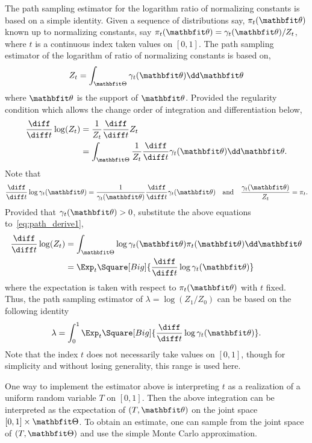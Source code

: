 The path sampling estimator for the logarithm ratio of normalizing constants
is based on a simple identity. Given a sequence of distributions say,
$\pi_t(\bth)$ known up to normalizing constants, say $\pi_t(\bth) =
\gamma_t(\bth)/Z_t$, where $t$ is a continuous index taken values on $[0,1]$.
The path sampling estimator of the logarithm of ratio of normalizing constants
is based on,
\begin{equation}
  Z_t = \int_{\bTh}\gamma_t(\bth)\dd\bth
\end{equation}
where $\bth$ is the support of $\bth$. Provided the regularity condition which
allows the change order of integration and differentiation below,
\begin{align}
  \frac{\diff}{\diff t}\log(Z_t)
  &= \frac{1}{Z_t}\frac{\diff}{\diff t}Z_t \notag\\
  &= \int_{\bTh}\frac{1}{Z_t}
  \frac{\diff}{\diff t}\gamma_t(\bth)\dd\bth.
  \label{eq:path_derive1}
\end{align}
Note that
\begin{equation}
  \frac{\diff}{\diff t}\log\gamma_t(\bth)
  = \frac{1}{\gamma_t(\bth)}\frac{\diff}{\diff t}\gamma_t(\bth)
  \quad\text{and}\quad
  \frac{\gamma_t(\bth)}{Z_t} = \pi_t.
\end{equation}
Provided that $\gamma_t(\bth)>0$, substitute the above equations
to~\eqref{eq:path_derive1},
\begin{align}
  \frac{\diff}{\diff t}\log(Z_t)
  &= \int_{\bTh}\log\gamma_t(\bth)\pi_t(\bth)\dd\bth \notag\\
  &= \Exp_t\Square[Big]{\frac{\diff}{\diff t}\log\gamma_t(\bth)}
\end{align}
where the expectation is taken with respect to $\pi_t(\bth)$ with $t$ fixed.
Thus, the path sampling estimator of $\lambda=\log(Z_1/Z_0)$ can be based on
the following identity
\begin{equation}
  \lambda=
  \int_0^1 \Exp_t\Square[Big]{\frac{\diff}{\diff t}\log \gamma_t(\bth)}.
  \label{eq:z_path}
\end{equation}
Note that the index $t$ does not necessarily take values on $[0,1]$, though
for simplicity and without losing generality, this range is used here.

One way to implement the estimator above is interpreting $t$ as a realization
of a uniform random variable $T$ on $[0,1]$. Then the above integration can be
interpreted as the expectation of $(T,\bth)$ on the joint space
$[0,1]\times\bTh$. To obtain an estimate, one can sample from the joint space
of $(T, \bTh)$ and use the simple Monte Carlo approximation.

